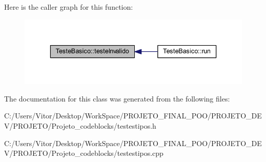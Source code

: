Here is the caller graph for this function\-:\nopagebreak
\begin{figure}[H]
\begin{center}
\leavevmode
\includegraphics[width=336pt]{class_teste_basico_ab092e20a2d01f8cd1b969a31cc6172b9_icgraph}
\end{center}
\end{figure}




The documentation for this class was generated from the following files\-:\begin{DoxyCompactItemize}
\item 
C\-:/\-Users/\-Vitor/\-Desktop/\-Work\-Space/\-P\-R\-O\-J\-E\-T\-O\-\_\-\-F\-I\-N\-A\-L\-\_\-\-P\-O\-O/\-P\-R\-O\-J\-E\-T\-O\-\_\-\-D\-E\-V/\-P\-R\-O\-J\-E\-T\-O/\-Projeto\-\_\-codeblocks/testestipos.\-h\item 
C\-:/\-Users/\-Vitor/\-Desktop/\-Work\-Space/\-P\-R\-O\-J\-E\-T\-O\-\_\-\-F\-I\-N\-A\-L\-\_\-\-P\-O\-O/\-P\-R\-O\-J\-E\-T\-O\-\_\-\-D\-E\-V/\-P\-R\-O\-J\-E\-T\-O/\-Projeto\-\_\-codeblocks/testestipos.\-cpp\end{DoxyCompactItemize}
